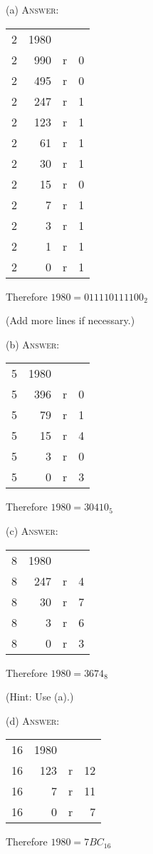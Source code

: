 (a)
\textsc{Answer:}\vspace{-2mm}
\begin{answerlong}
\begin{longtable}{r|rrr}
  2 & 1980 &   &   \\ \cline{2-4}
  2 &  990 & r & 0 \\ \cline{2-4}
  2 &  495 & r & 0 \\ \cline{2-4}
  2 &  247 & r & 1 \\ \cline{2-4}
  2 &  123 & r & 1 \\ \cline{2-4}
  2 &   61 & r & 1 \\ \cline{2-4}
  2 &   30 & r & 1 \\ \cline{2-4}
  2 &   15 & r & 0 \\ \cline{2-4}
  2 &    7 & r & 1 \\ \cline{2-4}
  2 &    3 & r & 1 \\ \cline{2-4}
  2 &    1 & r & 1 \\ \cline{2-4}
  2 &    0 & r & 1 \\ \cline{2-4}
\end{longtable}
Therefore $1980 = 0111 1011 1100_{2}$
\end{answerlong}
(Add more lines if necessary.)

(b)
\textsc{Answer:}\vspace{-2mm}
\begin{answerlong}
\begin{longtable}{r|rrr}
  5 & 1980 &   &   \\ \cline{2-4}
  5 &  396 & r & 0 \\ \cline{2-4}
  5 &   79 & r & 1 \\ \cline{2-4}
  5 &   15 & r & 4 \\ \cline{2-4}
  5 &    3 & r & 0 \\ \cline{2-4}
  5 &    0 & r & 3 \\ \cline{2-4}
\end{longtable}
Therefore $1980 = 30410_{5}$
\end{answerlong}

(c)
\textsc{Answer:}\vspace{-2mm}
\begin{answerlong}
\begin{longtable}{r|rrr}
  8 & 1980 &   &   \\ \cline{2-4}
  8 &  247 & r & 4 \\ \cline{2-4}
  8 &   30 & r & 7 \\ \cline{2-4}
  8 &    3 & r & 6 \\ \cline{2-4}
  8 &    0 & r & 3 \\ \cline{2-4}
\end{longtable}
Therefore $1980 = 3674_{8}$
\end{answerlong}
(Hint: Use (a).)

(d)
\textsc{Answer:}\vspace{-2mm}
\begin{answerlong}
\begin{longtable}{r|rrr}
 16 & 1980 &   &    \\ \cline{2-4}
 16 &  123 & r & 12 \\ \cline{2-4}
 16 &    7 & r & 11 \\ \cline{2-4}
 16 &    0 & r &  7 \\ \cline{2-4}
\end{longtable}
Therefore $1980 = 7BC_{16}$
\end{answerlong}
